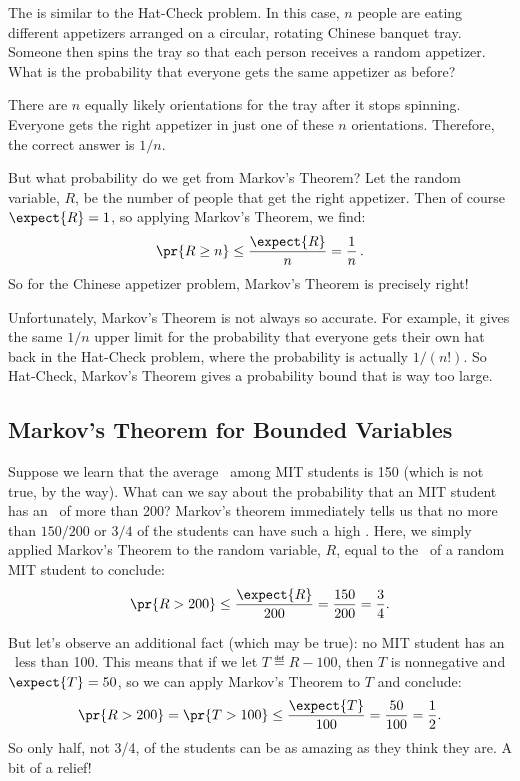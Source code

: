 The  is similar to the Hat-Check
problem.  In this case, $n$ people are eating different appetizers
arranged on a circular, rotating Chinese banquet tray.  Someone then
spins the tray so that each person receives a random appetizer.  What
is the probability that everyone gets the same appetizer as before?

There are $n$ equally likely orientations for the tray after it stops
spinning.  Everyone gets the right appetizer in just one of these $n$
orientations.  Therefore, the correct answer is $1/n$.

But what probability do we get from Markov's Theorem?  Let the random
variable, $R$, be the number of people that get the right appetizer.  
Then of course $\expect{R} = 1$, so
applying Markov's Theorem, we find:
\begin{displaymath}
  \pr{R \geq n} \leq \frac{\expect{R}}{n} = \frac{1}{n}\,.
\end{displaymath}
So for the Chinese appetizer problem, Markov's Theorem is precisely
right!

Unfortunately, Markov's Theorem is not always so accurate.  For
example, it gives the same $1/n$ upper limit for the probability that
everyone gets their own hat back in the Hat-Check problem, where the
probability is actually $1/(n!)$.  So Hat-Check, Markov's Theorem
gives a probability bound that is way too large.

\subsection{Markov's Theorem for Bounded Variables}

Suppose we learn that the average \IQ\ among MIT students is 150 (which is
not true, by the way).  What can we say about the probability that an MIT
student has an \IQ\ of more than 200?  Markov's theorem immediately tells
us that no more than $150/200$ or $3/4$ of the students can have such a
high \IQ.  Here, we simply applied Markov's Theorem to the random variable,
$R$, equal to the \IQ\ of a random MIT student to conclude:
\[
\pr{R > 200} \leq \frac{\expect{R}}{200}= \frac{150}{200} = \frac{3}{4}.
\]

But let's observe an additional fact (which may be true): no MIT student
has an \IQ\ less than 100.  This means that if we let $T \eqdef R-100$,
then $T$ is nonnegative and $\expect{T} = 50$, so we can apply Markov's
Theorem to $T$ and conclude:
\[
\pr{R > 200} = \pr{T > 100} \leq \frac{\expect{T}}{100}= \frac{50}{100} =
\frac{1}{2}.
\]
So only half, not 3/4, of the students can be as amazing as they think
they are.  A bit of a relief!

